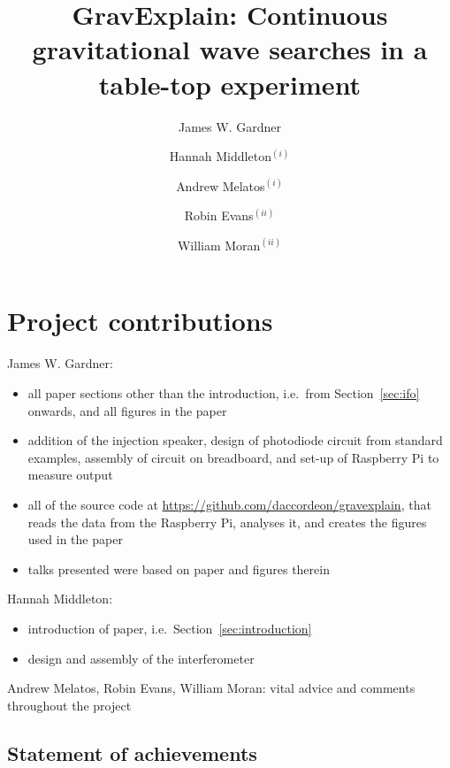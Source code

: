 \documentclass[prb,preprint]{revtex4-1}
\begin{document}
\section*{Project contributions}
James W. Gardner:
\begin{itemize}
\item all paper sections other than the introduction, i.e.\ from Section~\ref{sec:ifo} onwards, and all figures in the paper
\item addition of the injection speaker, design of photodiode circuit from standard examples, assembly of circuit on breadboard, and set-up of Raspberry Pi to measure output
\item all of the source code at \url{https://github.com/daccordeon/gravexplain}, that reads the data from the Raspberry Pi, analyses it, and creates the figures used in the paper
\item talks presented were based on paper and figures therein
\end{itemize}

Hannah Middleton:
\begin{itemize}
\item introduction of paper, i.e.\ Section~\ref{sec:introduction}
\item design and assembly of the interferometer
\end{itemize}

Andrew Melatos, Robin Evans, William Moran: vital advice and comments throughout the project

\subsection*{Statement of achievements}


\newpage

\title{GravExplain: Continuous gravitational wave searches in a table-top experiment}

\author{James W. Gardner}

\author{Hannah Middleton$^{(i)}$}
\author{Andrew Melatos$^{(i)}$}
\author{Robin Evans$^{(ii)}$}
\author{William Moran$^{(ii)}$}
\end{document}
